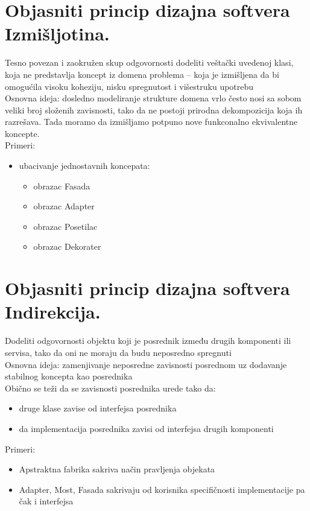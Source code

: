 \documentclass[a4paper]{article}
\begin{document}
\section{Objasniti princip dizajna softvera Izmišljotina.}
Tesno povezan i zaokružen skup odgovornosti dodeliti veštački uvedenoj klasi, koja ne predstavlja koncept iz domena problema – koja je izmišljena da bi omogućila visoku koheziju, nisku spregnutost i višestruku upotrebu\\

Osnovna ideja: dosledno modeliranje strukture domena vrlo često nosi sa sobom veliki
broj složenih zavisnosti, tako da ne postoji prirodna dekompozicija koja ih razrešava. Tada moramo da izmišljamo potpuno nove funkconalno ekvivalentne koncepte.\\

Primeri:
\begin{itemize}
   \item ubacivanje jednostavnih koncepata:
   \begin{itemize}
     \item obrazac Fasada
     \item obrazac Adapter
     \item obrazac Posetilac
     \item obrazac Dekorater
   \end{itemize}
\end{itemize}

\section{Objasniti princip dizajna softvera Indirekcija.}
Dodeliti odgovornosti objektu koji je posrednik između drugih komponenti ili servisa, tako da oni ne moraju da budu neposredno spregnuti\\

Osnovna ideja: zamenjivanje neposredne zavisnosti posrednom uz dodavanje stabilnog koncepta kao posrednika\\

Obično se teži da se zavisnosti posrednika urede tako da:
\begin{itemize}
   \item druge klase zavise od interfejsa posrednika
   \item da implementacija posrednika zavisi od interfejsa drugih komponenti\\
\end{itemize}
   
Primeri:
\begin{itemize}
   \item Apstraktna fabrika sakriva način pravljenja objekata
   \item Adapter, Most, Fasada sakrivaju od korisnika specifičnosti implementacije pa čak i interfejsa
\end{itemize}
\end{document}

